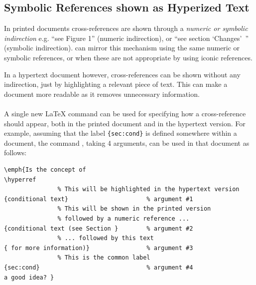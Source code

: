 \subsection{Symbolic References shown as Hyperized Text\label{hyperized}%
}%
\tableofchildlinks*
{}%
%
%
\html{\\}\noindent
In printed documents cross-references are shown 
through a \emph{numeric or symbolic indirection} 
e.g. ``see Figure 1'' (numeric indirection), 
or ``see section `Changes'~'' (symbolic indirection).  
\latextohtml{} can mirror this mechanism using the same numeric 
or symbolic references,
or when these are not appropriate by using iconic references.

%
\html{\\}%
In a hypertext document however, cross-references can be shown 
without any indirection, just by highlighting a relevant piece of text. 
This can make a document more readable as it removes unnecessary
information. 

%
\paragraph*{\label{hyperref}}
A single new \LaTeX{} command  can be used for
specifying how a cross-reference should appear, 
both in the printed document and in the hypertext version.
For example, assuming that the label \verb|{sec:cond}|\label{sec:cond} 
is defined somewhere within a document, 
the command , taking 4 arguments,
can be used in that document as follows:
%
%
\begin{small}
\begin{verbatim}
\emph{Is the concept of
\hyperref
               % This will be highlighted in the hypertext version
{conditional text}                      % argument #1
               % This will be shown in the printed version 
               % followed by a numeric reference ...      
{conditional text (see Section }        % argument #2
               % ... followed by this text
{ for more information)}                % argument #3
               % This is the common label 
{sec:cond}                              % argument #4
a good idea? }
\end{verbatim}
\end{small}


